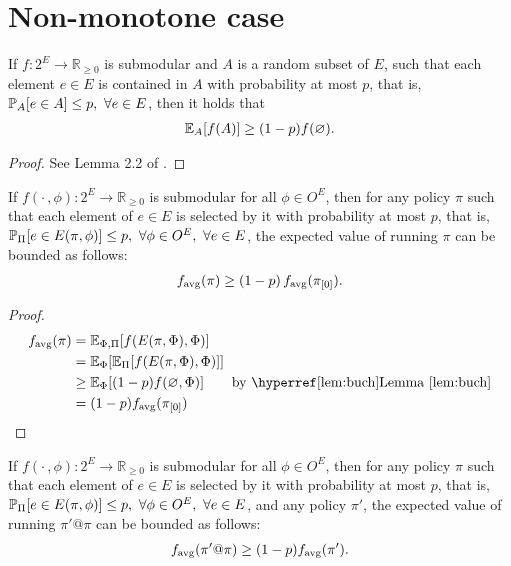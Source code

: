 \section{Non-monotone case}
\begin{lemma}\label{lem:buch}
  If $f : 2^E \to \mathbb{R}_{\geq 0}$ is submodular and $A$ is a random subset of $E$, such that each element $e \in E$ is contained in $A$ with probability at most $p$, that is, $\P[A]{e \in A} \leq p,\ \forall e \in E$, then it holds that
  \begin{align*}
    \E[A]{f(A)} \geq (1-p)f(\varnothing).
  \end{align*}
\end{lemma}
\begin{proof}
  See Lemma 2.2 of \citet{buchbinder14}.
\end{proof}

\begin{lemma}\label{lem:nmon}
  If $f(\cdot\,, \phi) : 2^E \to \mathbb{R}_{\geq 0}$ is submodular for all $\phi \in O^E$, then for any policy $\pi$ such that each element of $e \in E$ is selected by it with probability at most $p$, that is, $\P[\Pi]{e \in E(\pi, \phi)} \leq p,\ \forall \phi \in O^E,\ \forall e \in E$, the expected value of running $\pi$ can be bounded as follows:
\begin{align*}
  f_{\mathrm{avg}}(\pi) \geq (1-p)\,f_{\mathrm{avg}}(\pi_{[0]}).
\end{align*}
\end{lemma}
\begin{proof}
  \begin{align*}
    \favg(\pi) &= \E[\Phi,\Pi]{f(E(\pi, \Phi), \Phi)}\\
               &= \E[\Phi]{\E[\Pi]{f(E(\pi, \Phi), \Phi)}}\\
               &\geq \E[\Phi]{(1-p)f(\varnothing, \Phi)} \tag*{by \lemmaref{lem:buch}}\\
               &= (1-p)\favg(\pio)
  \end{align*}
\end{proof}

\begin{cor}\label{cor:nmon}
  If $f(\cdot\,, \phi) : 2^E \to \mathbb{R}_{\geq 0}$ is submodular for all $\phi \in O^E$, then for any policy $\pi$ such that each element of $e \in E$ is selected by it with probability at most $p$, that is, $\P[\Pi]{e \in E(\pi, \phi)} \leq p,\ \forall \phi \in O^E,\ \forall e \in E$, and any policy $\pi'$, the expected value of running $\pi'@\pi$ can be bounded as follows:
\begin{align*}
  f_{\mathrm{avg}}(\pi' @ \pi) \geq (1-p)f_{\mathrm{avg}}(\pi').
\end{align*}
\end{cor}


